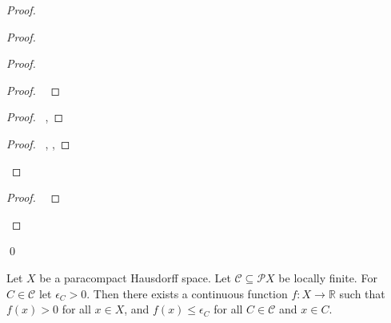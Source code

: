 \begin{proof}
\begin{proof}
\begin{proof}
\begin{proof}
      \pf\ 
    \end{proof}
    \begin{proof}
      \pf\ , 
    \end{proof}
    \begin{proof}
      \pf\ , , 
    \end{proof}
  \end{proof}
  \begin{proof}
    \pf\ 
  \end{proof}
\end{proof}
\qed
\end{proof}

\begin{thm}
  Let $X$ be a paracompact Hausdorff space. Let $\mathcal{C} \subseteq \mathcal{P} X$ be locally finite. For $C \in \mathcal{C}$ let $\epsilon_C > 0$. Then there exists a continuous function $f : X \rightarrow \mathbb{R}$ such that $f(x) > 0$ for all $x \in X$, and $f(x) \leq \epsilon_C$ for all $C \in \mathcal{C}$ and $x \in C$.
\end{thm}

